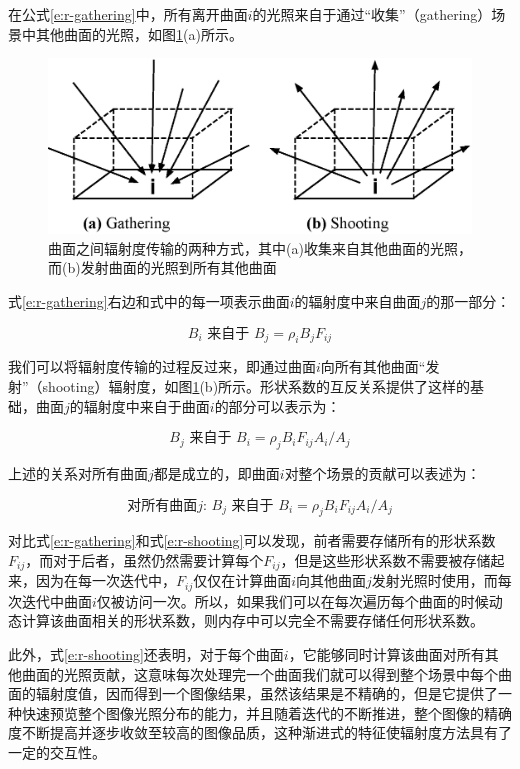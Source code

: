 在公式\ref{e:r-gathering}中，所有离开曲面$i$的光照来自于通过“收集”（gathering）场景中其他曲面的光照，如图\ref{f:r-gathering-and-shooting}(a)所示。

\begin{figure}
\sidecaption
	\includegraphics[width=.65\textwidth]{figures/r/shooting}
	\caption{曲面之间辐射度传输的两种方式，其中(a)收集来自其他曲面的光照，而(b)发射曲面的光照到所有其他曲面}	
	\label{f:r-gathering-and-shooting}
\end{figure}

式\ref{e:r-gathering}右边和式中的每一项表示曲面$i$的辐射度中来自曲面$j$的那一部分：

\begin{equation}
	B_i \text{ 来自于 }B_j=\rho_i B_j F_{ij}
\end{equation}

我们可以将辐射度传输的过程反过来，即通过曲面$i$向所有其他曲面“发射”（shooting）辐射度，如图\ref{f:r-gathering-and-shooting}(b)所示。形状系数的互反关系提供了这样的基础，曲面$j$的辐射度中来自于曲面$i$的部分可以表示为：

\begin{equation}\label{e:r-shooting}
	B_j\text{ 来自于 }B_i=\rho_j B_iF_{ij}A_i/A_j
\end{equation}

\noindent 上述的关系对所有曲面$j$都是成立的，即曲面$i$对整个场景的贡献可以表述为：

\begin{equation}\label{e:r-shooting}
	\text{对所有曲面$j$: } B_j\text{ 来自于 }B_i=\rho_j B_iF_{ij}A_i/A_j
\end{equation}

\noindent 对比式\ref{e:r-gathering}和式\ref{e:r-shooting}可以发现，前者需要存储所有的形状系数$F_{ij}$，而对于后者，虽然仍然需要计算每个$F_{ij}$，但是这些形状系数不需要被存储起来，因为在每一次迭代中，$F_{ij}$仅仅在计算曲面$i$向其他曲面$j$发射光照时使用，而每次迭代中曲面$i$仅被访问一次。所以，如果我们可以在每次遍历每个曲面的时候动态计算该曲面相关的形状系数，则内存中可以完全不需要存储任何形状系数。

此外，式\ref{e:r-shooting}还表明，对于每个曲面$i$，它能够同时计算该曲面对所有其他曲面的光照贡献，这意味每次处理完一个曲面我们就可以得到整个场景中每个曲面的辐射度值，因而得到一个图像结果，虽然该结果是不精确的，但是它提供了一种快速预览整个图像光照分布的能力，并且随着迭代的不断推进，整个图像的精确度不断提高并逐步收敛至较高的图像品质，这种渐进式的特征使辐射度方法具有了一定的交互性。

